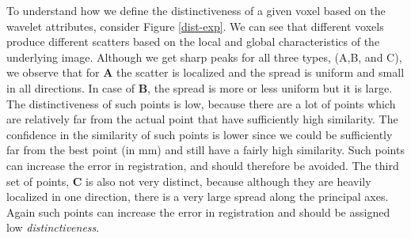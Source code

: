 To understand how we define the distinctiveness of a given voxel based on the wavelet attributes, consider Figure \ref{dist-exp}. We can see that different voxels produce different scatters based on the local and global characteristics of the underlying image. Although we get sharp peaks for all three types, (A,B, and C), we observe that for {\bf A} the scatter is localized and the spread is uniform and small in all directions. In case of {\bf B}, the spread is more or less uniform but it is large. The distinctiveness of such points is low, because there are a lot of points which are relatively far from the actual point that have sufficiently high similarity. The confidence in the similarity of such points is lower since we could be sufficiently far from the best point (in mm) and still have a fairly high similarity. Such points can increase the error in registration, and should therefore be avoided. The third set of points, {\bf C} is also not very distinct, because although they are heavily localized in one direction, there is a very large spread along the principal axes. Again such points can increase the error in registration and should be assigned low {\em distinctiveness}. 

